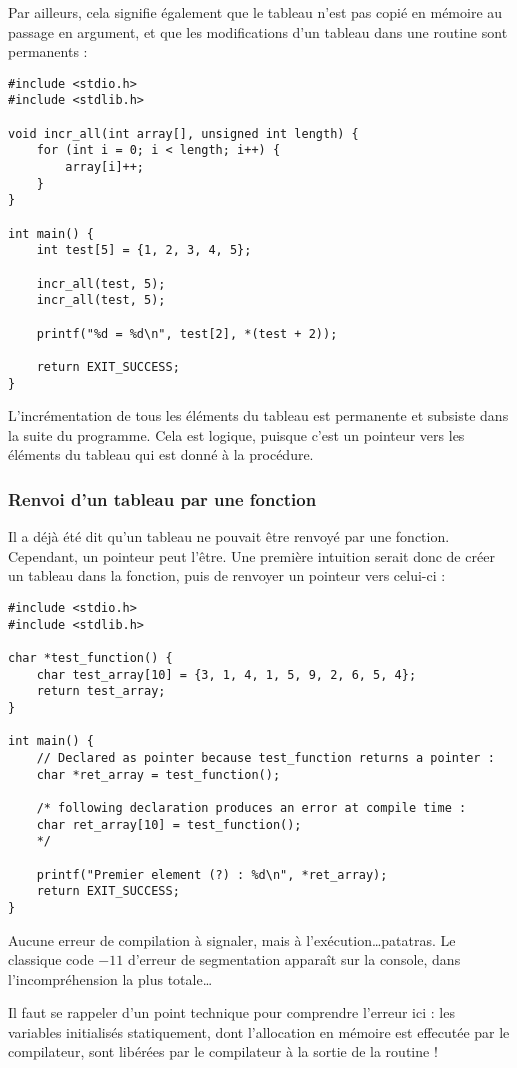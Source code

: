 \documentclass[../../../main.tex]{subfiles}
\begin{document}
Par ailleurs, cela signifie également que le tableau n'est pas copié en mémoire au passage en argument, et que les modifications d'un tableau dans une routine sont permanents :
\begin{verbatim}
#include <stdio.h>
#include <stdlib.h>

void incr_all(int array[], unsigned int length) {
	for (int i = 0; i < length; i++) {
		array[i]++;
	}
}

int main() {
	int test[5] = {1, 2, 3, 4, 5};
	
	incr_all(test, 5);
	incr_all(test, 5);

	printf("%d = %d\n", test[2], *(test + 2)); 

	return EXIT_SUCCESS;
}
\end{verbatim}
L'incrémentation de tous les éléments du tableau est permanente et subsiste dans la suite du programme. Cela est logique, puisque c'est un pointeur vers les éléments du tableau qui est donné à la procédure.
\subsubsection{Renvoi d'un tableau par une fonction}
Il a déjà été dit qu'un tableau ne pouvait être renvoyé par une fonction. Cependant, un pointeur peut l'être. Une première intuition serait donc de créer un tableau dans la fonction, puis de renvoyer un pointeur vers celui-ci :
\begin{verbatim}
#include <stdio.h>
#include <stdlib.h>

char *test_function() {
	char test_array[10] = {3, 1, 4, 1, 5, 9, 2, 6, 5, 4};
	return test_array;
}

int main() {
	// Declared as pointer because test_function returns a pointer :
	char *ret_array = test_function();
	
	/* following declaration produces an error at compile time :
	char ret_array[10] = test_function();
	*/
	
	printf("Premier element (?) : %d\n", *ret_array);
	return EXIT_SUCCESS;
}
\end{verbatim}
Aucune erreur de compilation à signaler, mais à l'exécution\dots patatras. Le classique code $-11$ d'erreur de segmentation apparaît sur la console, dans l'incompréhension la plus totale\dots
 
Il faut se rappeler d'un point technique pour comprendre l'erreur ici : les variables initialisés statiquement, dont l'allocation en mémoire est effecutée par le compilateur, sont libérées par le compilateur à la sortie de la routine !
 
\end{document}
